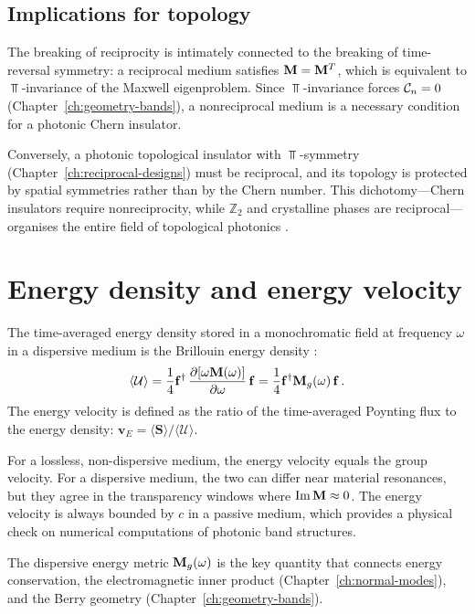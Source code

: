 \subsection{Implications for topology}
\label{sec:ch2-reciprocity-topology}

The breaking of reciprocity is intimately connected to the breaking
of time-reversal symmetry: a reciprocal medium satisfies
$\mathbf{M}=\mathbf{M}^T$, which is equivalent to $\Top$-invariance of the
Maxwell eigenproblem.  Since $\Top$-invariance forces
$\mathcal{C}_n=0$ (Chapter~\ref{ch:geometry-bands}), a nonreciprocal
medium is a necessary condition for a photonic Chern insulator.

Conversely, a photonic topological insulator with $\Top$-symmetry
(Chapter~\ref{ch:reciprocal-designs}) must be reciprocal, and its
topology is protected by spatial symmetries rather than by the Chern
number.  This dichotomy---Chern insulators require nonreciprocity,
while $\mathbb{Z}_2$ and crystalline phases are reciprocal---organises
the entire field of topological photonics
\cite{haldane2008possible,price2022roadmap}.

\section{Energy density and energy velocity}
\label{sec:ch2-energy-velocity}

The time-averaged energy density stored in a monochromatic field
at frequency $\omega$ in a dispersive medium is the Brillouin energy
density \cite{gangaraj2016berry,silveirinha2016bulk}:
\begin{equation}\label{eq:ch2-brillouin-energy-density}
  \langle\mathcal{U}\rangle
  = \frac{1}{4}\mathbf{f}^\dagger\,
  \frac{\partial[\omega\mathbf{M}(\omega)]}{\partial\omega}\,\mathbf{f}
  = \frac{1}{4}\mathbf{f}^\dagger\mathbf{M}_g(\omega)\,\mathbf{f}\,.
\end{equation}
The energy velocity is defined as the ratio of the time-averaged
Poynting flux to the energy density:
$\mathbf{v}_E=\langle\mathbf{S}\rangle/\langle\mathcal{U}\rangle$.

For a lossless, non-dispersive medium, the energy velocity equals
the group velocity.  For a dispersive medium, the two can differ near
material resonances, but they agree in the transparency windows where
$\mathrm{Im}\,\mathbf{M}\approx 0$.  The energy velocity is always bounded by
$c$ in a passive medium, which provides a physical check on numerical
computations of photonic band structures.

The dispersive energy metric $\mathbf{M}_g(\omega)$ is the key quantity
that connects energy conservation, the electromagnetic inner product
(Chapter~\ref{ch:normal-modes}), and the Berry geometry
(Chapter~\ref{ch:geometry-bands}).

